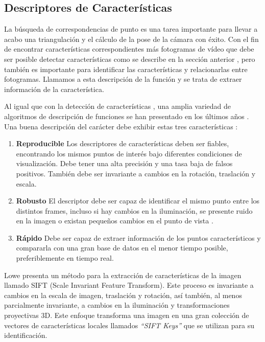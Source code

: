 \subsection{Descriptores de Características}
La búsqueda de correspondencias de punto es una tarea importante para llevar a acabo una triangulación y el cálculo de la pose de la cámara con éxito. Con el fin de encontrar características correspondientes más fotogramas de vídeo que debe ser posible detectar características como se describe en la sección anterior , pero también es importante para identificar las características y relacionarlas entre fotogramas. Llamamos a esta descripción de la función y se trata de extraer información de la característica.

Al igual que con la detección de características , una amplia variedad de algoritmos de descripción de funciones se han presentado en los últimos años . Una buena descripción del carácter debe exhibir estas tres características :

\begin{enumerate}
\item \textbf{Reproducible}  Los descriptores de características deben ser fiables, encontrando los mismos puntos de interés bajo diferentes condiciones de visualización. Debe tener una alta precisión y una tasa baja de falsos positivos. También debe ser invariante a cambios en la rotación, traslación y escala.
\item \textbf{Robusto} El descriptor debe ser capaz de identificar el mismo punto entre los distintos frames, incluso si hay cambios en la iluminación, se presente ruido en la imagen o existan pequeños cambios en el  punto de vista .
\item \textbf{Rápido} Debe ser capaz de extraer información de los puntos característicos y compararla con una gran base de datos en el menor tiempo posible, preferiblemente en tiempo real.
\end{enumerate}

Lowe \cite{Lowe} presenta un método para la extracción de características de la imagen llamado SIFT (Scale Invariant Feature Transform). Este proceso es invariante a cambios en la escala de imagen, traslación y rotación, así también, al menos parcialmente invariante, a cambios en la iluminación y transformaciones proyectivas 3D. Este enfoque transforma una imagen en una gran colección de vectores de características locales llamados  \emph{``SIFT Keys''} que se utilizan para su identificación.

